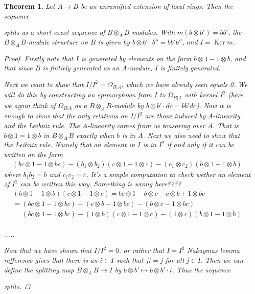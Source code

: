 \documentclass[11pt, a4paper, english]{article}
\numberwithin{prop}{section}
\numberwithin{lemma}{section}
\newtheorem{theorem}{Theorem}
\numberwithin{theorem}{section}
\numberwithin{defin}{section}
\numberwithin{example}{section}
\DeclareMathOperator{\Ker}{Ker}
\begin{document}
\begin{theorem}
Let $A \to B$ be an unramified extension of local rings. Then the sequence
\begin{center}
\end{center}
splits as a short exact sequence of $B\otimes_AB$-modules. With $m(b \otimes b') = bb'$, the $B \otimes_A B$-module structure on $B$ is given by $b \otimes b' \cdot b'' = bb'b''$, and $I = \Ker m$.

\begin{proof}
Firstly note that $I$ is generated by elements on the form $b \otimes 1 - 1 \otimes b$, and that since $B$ is fintiely generated as an $A$-module, $I$ is finitely generated.

Next we want to show that $I/I^2 = \Omega_{B|A}$, which we have already seen equals 0. We will do this by constructing an epimorphism from $I$ to $\Omega_{B|A}$ with kernel $I^2$ (here we again think of $\Omega_{B|A}$ as a $B \otimes_A B$-module by $b \otimes b' \cdot dc = bb'dc$). Now it is enough to show that the only relations on $I/I^2$ are those induced by $A$-linearity and the Leibniz rule. The $A$-linearity comes from us tensoring over $A$. That is $b \otimes 1 = 1 \otimes b$ in $B \otimes_A B$ exactly when $b$ is in $A$. Next we also need to show that the Leibniz rule. Namely that an element in $I$ is in $I^2$ if and only if it can be written on the form 
\begin{align*}
(bc \otimes 1 - 1 \otimes bc) - (b_1 \otimes b_2)(c \otimes 1 - 1 \otimes c) - (c_1 \otimes c_2)(b \otimes 1 - 1 \otimes b)
\end{align*}
where $b_1b_2 = b$ and $c_1c_2=c$. It's a simple computation to check wether an element of $I^2$ can be written this way. {\color{red} Something is wrong here????}
\begin{align*}
(b \otimes 1 - 1 \otimes b)(c \otimes 1 - 1 \otimes c) = bc \otimes 1 - b \otimes c - c \otimes b + 1 \otimes bc \\
= (bc \otimes 1 - 1 \otimes bc) - (c \otimes b - 1 \otimes bc) - (b \otimes c - 1 \otimes bc)\\
= (bc \otimes 1 - 1 \otimes bc) - (1 \otimes b)(c \otimes 1 - 1 \otimes c) - (1 \otimes c)(b \otimes 1 - 1 \otimes b)\\
\end{align*}

.....

Now that we have shown that $I/I^2 = 0$, or rather that $I = I^2$ Nakaymas lemma {\color{red} refference} gives that there is an $i \in I$ such that $ji = j$ for all $j \in I$. Then we can define the splitting map $B \otimes_A B \to I$ by $b \otimes b' \mapsto b \otimes b' \cdot i$. Thus the sequence 
\begin{center}
\end{center}
splits.
\end{proof}
\end{theorem}
\end{document}
